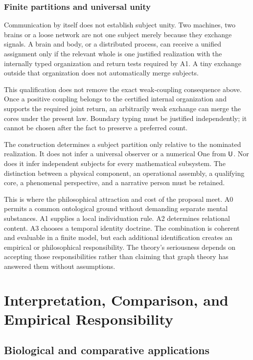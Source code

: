 \section{Finite partitions and universal unity}\label{section:split:finite-partitions-and-universal-unity}
Communication by itself does not establish subject unity. Two machines, two brains or a loose network are not one subject merely because they exchange signals. A brain and body, or a distributed process, can receive a unified assignment only if the relevant whole is one justified realization with the internally typed organization and return tests required by A1. A tiny exchange outside that organization does not automatically merge subjects.

This qualification does not remove the exact weak-coupling consequence above. Once a positive coupling belongs to the certified internal organization and supports the required joint return, an arbitrarily weak exchange can merge the cores under the present law. Boundary typing must be justified independently; it cannot be chosen after the fact to preserve a preferred count.

The construction determines a subject partition only relative to the nominated realization. It does not infer a universal observer or a numerical One from $\mathsf{U}$. Nor does it infer independent subjects for every mathematical subsystem. The distinction between a physical component, an operational assembly, a qualifying core, a phenomenal perspective, and a narrative person must be retained.

This is where the philosophical attraction and cost of the proposal meet. A0 permits a common ontological ground without demanding separate mental substances. A1 supplies a local individuation rule. A2 determines relational content. A3 chooses a temporal identity doctrine. The combination is coherent and evaluable in a finite model, but each additional identification creates an empirical or philosophical responsibility. The theory's seriousness depends on accepting those responsibilities rather than claiming that graph theory has answered them without assumptions.


\part{Interpretation, Comparison, and Empirical Responsibility}\label{part:implications}
\chapter{Biological and comparative applications}\label{ch:comparative}
